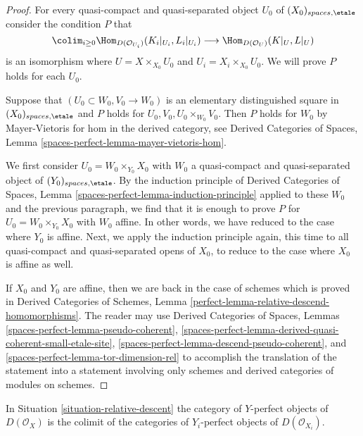 \begin{proof}
For every quasi-compact and quasi-separated object $U_0$ of
$(X_0)_{spaces, \etale}$ consider the condition $P$ that
$$
\colim_{i \geq 0} \Hom_{D(\mathcal{O}_{U_i})}(K_i|_{U_i}, L_i|_{U_i})
\longrightarrow
\Hom_{D(\mathcal{O}_U)}(K|_U, L|_U)
$$
is an isomorphism where $U = X \times_{X_0} U_0$ and
$U_i = X_i \times_{X_0} U_0$. We will prove $P$ holds for each $U_0$.

\medskip\noindent
Suppose that $(U_0 \subset W_0, V_0 \to W_0)$ is an elementary
distinguished square in $(X_0)_{spaces, \etale}$
and $P$ holds for $U_0, V_0, U_0 \times_{W_0} V_0$.
Then $P$ holds for $W_0$ by Mayer-Vietoris
for hom in the derived category, see Derived Categories of Spaces,
Lemma \ref{spaces-perfect-lemma-mayer-vietoris-hom}.

\medskip\noindent
We first consider $U_0 = W_0 \times_{Y_0} X_0$ with $W_0$ a
quasi-compact and quasi-separated object of $(Y_0)_{spaces, \etale}$.
By the induction principle of Derived Categories of Spaces,
Lemma \ref{spaces-perfect-lemma-induction-principle}
applied to these $W_0$ and the previous paragraph,
we find that it is enough to prove
$P$ for $U_0 = W_0 \times_{Y_0} X_0$ with $W_0$ affine.
In other words, we have reduced to the case where $Y_0$ is affine.
Next, we apply the induction principle again, this time to all
quasi-compact and quasi-separated opens of $X_0$, to reduce to the
case where $X_0$ is affine as well.

\medskip\noindent
If $X_0$ and $Y_0$ are affine, then we are back in the case
of schemes which is proved in
Derived Categories of Schemes, Lemma
\ref{perfect-lemma-relative-descend-homomorphisms}.
The reader may use
Derived Categories of Spaces, Lemmas
\ref{spaces-perfect-lemma-pseudo-coherent},
\ref{spaces-perfect-lemma-derived-quasi-coherent-small-etale-site},
\ref{spaces-perfect-lemma-descend-pseudo-coherent}, and
\ref{spaces-perfect-lemma-tor-dimension-rel}
to accomplish the translation of the statement into a statement
involving only schemes and derived categories of modules on schemes.
\end{proof}

\begin{lemma}
\label{lemma-descend-relatively-perfect}
In Situation \ref{situation-relative-descent} the category of
$Y$-perfect objects of $D(\mathcal{O}_X)$ is the colimit of the categories
of $Y_i$-perfect objects of $D(\mathcal{O}_{X_i})$.
\end{lemma}

